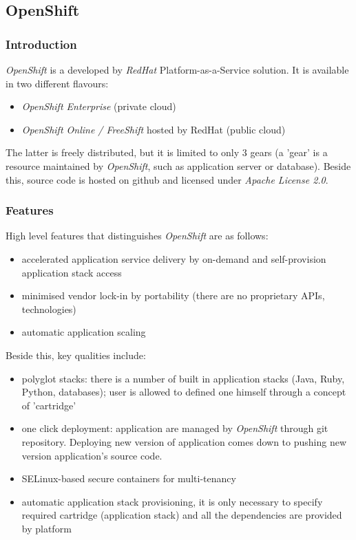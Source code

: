 \subsection{OpenShift}

\subsubsection{Introduction}
\emph{OpenShift} is a developed by \emph{RedHat} Platform-as-a-Service solution. It is available in two different flavours:
\begin{itemize}
 \item \emph{OpenShift Enterprise} (private cloud)
 \item \emph{OpenShift Online / FreeShift} hosted by RedHat (public cloud)
\end{itemize}

The latter is freely distributed, but it is limited to only 3 gears (a 'gear' is a resource maintained by \emph{OpenShift}, such as application server or database). Beside this, source code is hosted on github and licensed under \emph{Apache License 2.0}.

\subsubsection{Features}
High level features that distinguishes \emph{OpenShift} are as follows:
\begin{itemize}
  \item accelerated application service delivery by on-demand and self-provision application stack access
  \item minimised vendor lock-in by portability (there are no proprietary APIs, technologies)
  \item automatic application scaling
\end{itemize}

Beside this, key qualities include:
\begin{itemize}
  \item polyglot stacks: there is a number of built in application stacks (Java, Ruby, Python, databases); user is allowed to defined one himself through a concept of 'cartridge'
  \item one click deployment: application are managed by \emph{OpenShift} through git repository. Deploying new version of application comes down to pushing new version application's source code.
  \item SELinux-based secure containers for multi-tenancy
  \item automatic application stack provisioning, it is only necessary to specify required cartridge (application stack) and all the dependencies are provided by platform
\end{itemize}

